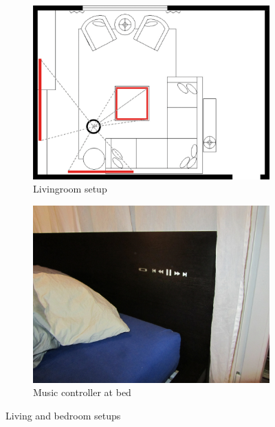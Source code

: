 \begin{figure}[htbp]
        \centering
        \begin{subfigure}[b]{0.485\textwidth}
        \includegraphics[width=\textwidth]{images/interview/livingroom.pdf}
                \caption{Livingroom setup}
                \label{img:livingRoomSetup}
        \end{subfigure}%
         \hfill 
        \begin{subfigure}[b]{0.475\textwidth}
                \includegraphics[width=\textwidth]{images/interview/bed.jpg}
                \caption{Music controller at bed}
                \label{img:bedSetup}
        \end{subfigure}
        \caption{Living and bedroom setups}\label{fig:livebed}
\end{figure}

